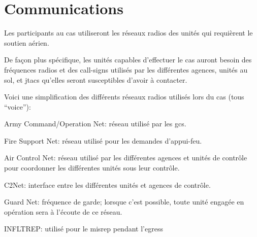\section{Communications}

\begin{e1}
    \item Les participants au \gls{cas} utiliseront les réseaux radios des unités qui requièrent le soutien aérien.
    \item
    De façon plus spécifique, les unités capables d'effectuer le \gls{cas} auront besoin des fréquences radios et des call-signs utilisés par les différentes agences, unités au sol, et \glspl{jtac} qu'elles seront susceptibles d'avoir à contacter.
    \item Voici une simplification des différents réseaux radios utilisés lors du \gls{cas} (tous ``voice''):
    \begin{e2}
        \item Army Command/Operation Net: réseau utilisé par les \glspl{gc}.
        \item Fire Support Net: réseau utilisé pour les demandes d'appui-feu.
        \item Air Control Net: réseau utilisé par les différentes agences et unités de contrôle pour coordonner les différentes unités sous leur contrôle.
        \item C2Net: interface entre les différentes unités et agences de contrôle.
        \item Guard Net: fréquence de garde; lorsque c'est possible, toute unité engagée en opération sera à l'écoute de ce réseau.
        \item INFLTREP: utilisé pour le \gls{misrep} pendant l'egress
    \end{e2}
\end{e1}
